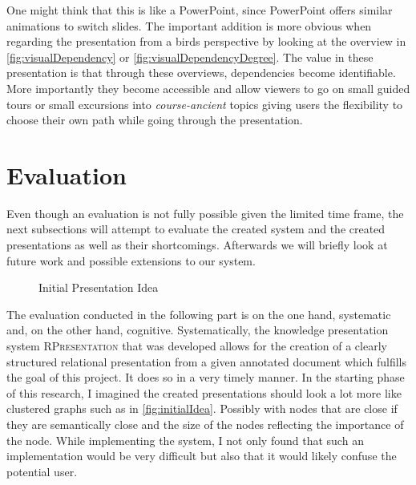 \documentclass[twoside, 12pt]{article}
\newcommand{\sys}{\textsc{RPresentation}\xspace}
\begin{document}
One might think that this is like a PowerPoint, since PowerPoint offers similar animations to switch slides. The important addition is more obvious when regarding the presentation from a birds perspective by looking at the overview in \autoref{fig:visualDependency} or \autoref{fig:visualDependencyDegree}. The value in these presentation is that through these overviews, dependencies become identifiable. More importantly they become accessible and allow viewers to go on small guided tours or small excursions into \textit{course-ancient} topics giving users the flexibility to choose their own path while going through the presentation.\\

\section{Evaluation}
\label{sec:eval}

Even though an evaluation is not fully possible given the limited time frame, the next subsections will attempt to evaluate the created system and the created presentations as well as their shortcomings. Afterwards we will briefly look at future work and possible extensions to our system.\\

\begin{figure}
\vspace{-28pt}
  \begin{center}
\vspace{-5pt}
  \caption{Initial Presentation Idea}
  \label{fig:initialIdea}
\vspace{-24pt}
  \end{center}
\end{figure}

The evaluation conducted in the following part is on the one hand, systematic and, on the other hand, cognitive. Systematically, the knowledge presentation system \sys that was developed allows for the creation of a clearly structured relational presentation from a given annotated document which fulfills the goal of this project. It does so in a very timely manner. In the starting phase of this research, I imagined the created presentations should look a lot more like clustered graphs such as in \autoref{fig:initialIdea}. Possibly with nodes that are close if they are semantically close and the size of the nodes reflecting the importance of the node. While implementing the system, I not only found that such an implementation would be very difficult but also that it would likely confuse the potential user.\\
\end{document}
